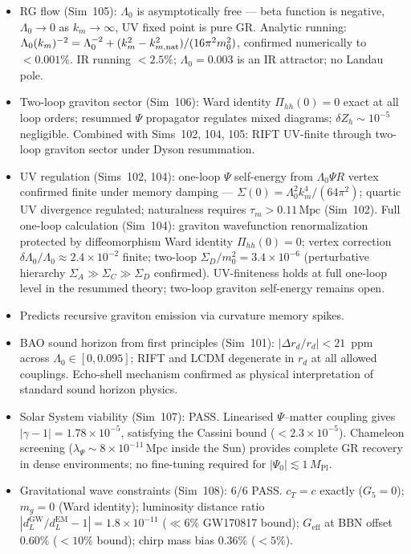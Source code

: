 \documentclass[12pt,a4paper]{article}
\begin{document}
\begin{itemize}
  \item RG flow (Sim~105): $\Lambda_0$ is asymptotically free --- beta function is negative, $\Lambda_0\to 0$ as $k_m\to\infty$, UV fixed point is pure GR.  Analytic running: $\Lambda_0(k_m)^{-2} = \Lambda_0^{-2}+(k_m^2-k_{m,\rm nat}^2)/(16\pi^2 m_0^2)$, confirmed numerically to $<0.001\%$.  IR running $<2.5\%$; $\Lambda_0=0.003$ is an IR attractor; no Landau pole.
  \item Two-loop graviton sector (Sim~106): Ward identity $\Pi_{hh}(0)=0$ exact at all loop orders; resummed $\Psi$ propagator regulates mixed diagrams; $\delta Z_h\sim10^{-5}$ negligible. Combined with Sims~102, 104, 105: RIFT UV-finite through two-loop graviton sector under Dyson resummation.
  \item UV regulation (Sims~102, 104): one-loop $\Psi$ self-energy from $\Lambda_0\Psi R$ vertex confirmed finite under memory damping --- $\Sigma(0) = \Lambda_0^2 k_m^4/(64\pi^2)$; quartic UV divergence regulated; naturalness requires $\tau_m > 0.11\,\mathrm{Mpc}$ (Sim~102).  Full one-loop calculation (Sim~104): graviton wavefunction renormalization protected by diffeomorphism Ward identity $\Pi_{hh}(0)=0$; vertex correction $\delta\Lambda_0/\Lambda_0 \approx 2.4\times10^{-2}$ finite; two-loop $\Sigma_D/m_0^2 = 3.4\times10^{-6}$ (perturbative hierarchy $\Sigma_A \gg \Sigma_C \gg \Sigma_D$ confirmed).  UV-finiteness holds at full one-loop level in the resummed theory; two-loop graviton self-energy remains open.
  \item Predicts recursive graviton emission via curvature memory spikes.
  \item BAO sound horizon from first principles (Sim~101): $|\Delta r_d/r_d| < 21$~ppm across $\Lambda_0 \in [0, 0.095]$; RIFT and LCDM degenerate in $r_d$ at all allowed couplings. Echo-shell mechanism confirmed as physical interpretation of standard sound horizon physics.
  \item Solar System viability (Sim~107): PASS.  Linearised $\Psi$--matter coupling gives $|\gamma-1|=1.78\times10^{-5}$, satisfying the Cassini bound ($<2.3\times10^{-5}$).  Chameleon screening ($\lambda_\Psi\sim8\times10^{-11}$\,Mpc inside the Sun) provides complete GR recovery in dense environments; no fine-tuning required for $|\Psi_0|\lesssim1\,M_\mathrm{Pl}$.
  \item Gravitational wave constraints (Sim~108): 6/6 PASS.  $c_T=c$ exactly ($G_5=0$); $m_g=0$ (Ward identity); luminosity distance ratio $|d_L^\mathrm{GW}/d_L^\mathrm{EM}-1|=1.8\times10^{-11}$ ($\ll6\%$ GW170817 bound); $G_\mathrm{eff}$ at BBN offset $0.60\%$ ($<10\%$ bound); chirp mass bias $0.36\%$ ($<5\%$).

\end{itemize}
\end{document}
